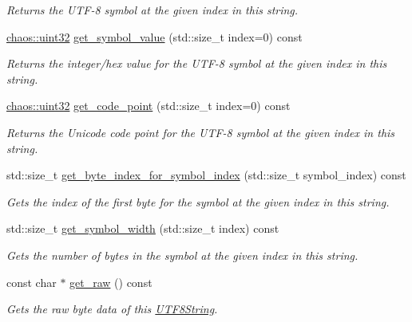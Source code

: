 \begin{DoxyCompactItemize}
\begin{DoxyCompactList}\small\item\em Returns the U\+T\+F-\/8 symbol at the given index in this string. \end{DoxyCompactList}\item 
\hyperlink{namespacechaos_a8641b3ae4551f0b35570d4f9f4ec22d9}{chaos\+::uint32} \hyperlink{classchaos_1_1uni_1_1_u_t_f8_string_a2787c287f4fdaa0b4f2c1c7eccbf8f99}{get\+\_\+symbol\+\_\+value} (std\+::size\+\_\+t index=0) const 
\begin{DoxyCompactList}\small\item\em Returns the integer/hex value for the U\+T\+F-\/8 symbol at the given index in this string. \end{DoxyCompactList}\item 
\hyperlink{namespacechaos_a8641b3ae4551f0b35570d4f9f4ec22d9}{chaos\+::uint32} \hyperlink{classchaos_1_1uni_1_1_u_t_f8_string_a20b2a700379ac8ba32882d99b8a2a539}{get\+\_\+code\+\_\+point} (std\+::size\+\_\+t index=0) const 
\begin{DoxyCompactList}\small\item\em Returns the Unicode code point for the U\+T\+F-\/8 symbol at the given index in this string. \end{DoxyCompactList}\item 
std\+::size\+\_\+t \hyperlink{classchaos_1_1uni_1_1_u_t_f8_string_a1c8f623ae90b3ebbd28a95135e5c81f0}{get\+\_\+byte\+\_\+index\+\_\+for\+\_\+symbol\+\_\+index} (std\+::size\+\_\+t symbol\+\_\+index) const 
\begin{DoxyCompactList}\small\item\em Gets the index of the first byte for the symbol at the given index in this string. \end{DoxyCompactList}\item 
std\+::size\+\_\+t \hyperlink{classchaos_1_1uni_1_1_u_t_f8_string_a5043fb9645ef29de2b11b69186ec4132}{get\+\_\+symbol\+\_\+width} (std\+::size\+\_\+t index) const 
\begin{DoxyCompactList}\small\item\em Gets the number of bytes in the symbol at the given index in this string. \end{DoxyCompactList}\item 
const char $\ast$ \hyperlink{classchaos_1_1uni_1_1_u_t_f8_string_a91d3bb4cfbfb573b3fa6ecf3312f4dee}{get\+\_\+raw} () const 
\begin{DoxyCompactList}\small\item\em Gets the raw byte data of this \hyperlink{classchaos_1_1uni_1_1_u_t_f8_string}{U\+T\+F8\+String}. \end{DoxyCompactList}\item 

\end{DoxyCompactItemize}
